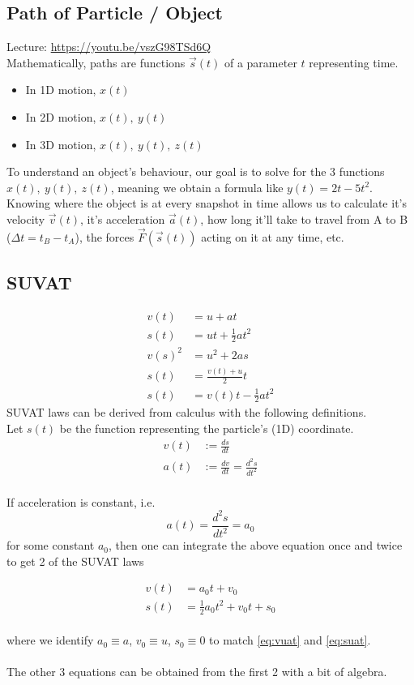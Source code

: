 \documentclass{article}
\begin{document}
\subsection{Path of Particle / Object}
Lecture: \url{https://youtu.be/vszG98TSd6Q}\\[10pt]
Mathematically, paths are functions $\vec{s}(t)$ of a parameter $t$ representing time. 
\begin{itemize}
    \item In 1D motion, $x(t)$ 
    \item In 2D motion, $x(t),\ y(t)$
    \item In 3D motion, $x(t),\ y(t),\ z(t)$
\end{itemize}
To understand an object's behaviour, our goal is to solve for the 3 functions $x(t),\ y(t),\ z(t)$, meaning we obtain a formula like $y(t) = 2 t - 5 t^2$. Knowing where the object is at every snapshot in time allows us to calculate it's velocity $\vec{v}(t)$, it's acceleration $\vec{a}(t)$, how long it'll take to travel from A to B ($\Delta t = t_B - t_A$), the forces $\vec{F}(\vec{s}(t))$ acting on it at any time, etc.

\subsection{SUVAT}
\begin{align}
v(t)&=u+a t \label{eq:vuat} \\
s(t)&=u t+\frac{1}{2} a t^2 \label{eq:suat}\\
 v(s)^2&=u^2+2 a s \label{eq:vuas} \\
 s(t)&=\frac{v(t)+u}{2} t \label{eq:svut}\\
 s(t)&=v(t) t-\frac{1}{2} a t^2 \label{eq:svat}
\end{align}
SUVAT laws can be derived from calculus with the following definitions.\\[10pt]
Let $s(t)$ be the function representing the particle's (1D) coordinate.
\begin{align}
    v(t) &:= \frac{ds}{dt} \\
    a(t) &:= \frac{dv}{dt} = \frac{d^2 s}{dt^2}
\end{align}
\\
If acceleration is constant, i.e. $$a(t) = \frac{d^2 s}{dt^2} = a_0$$ for some constant $a_0$, then one can integrate the above equation once and twice to get 2 of the SUVAT laws 

\begin{align}
    v(t) &= a_0 t + v_0 \\
    s(t) &= \frac{1}{2} a_0 t^2 + v_0 t + s_0 
\end{align}
\\
where we identify $a_0 \equiv a$, $v_0 \equiv u$, $s_0 \equiv 0$ to match \ref{eq:vuat} and \ref{eq:suat}.\\
\\
The other 3 equations can be obtained from the first 2 with a bit of algebra.\\
\end{document}
